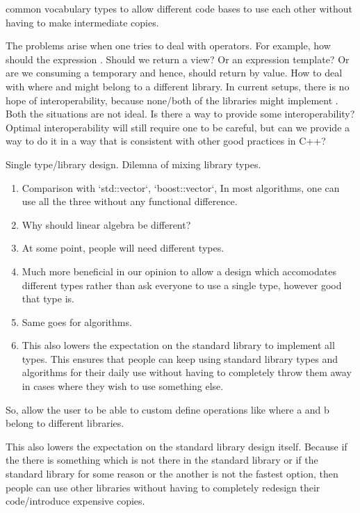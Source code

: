 \documentclass[oneside,11pt,a4paper]{jbarticle}
\begin{document}
common vocabulary types to allow different code bases to use each other without
having to make intermediate copies.


The problems arise when one tries to deal with operators. For example, how
should the expression . Should we return a view? Or an
expression template? Or are we consuming a temporary and hence, should return by
value. How to deal with  where  and 
might belong to a different library. In current setups, there is no hope of
interoperability, because none/both of the libraries might implement
. Both the situations are not ideal.
Is there a way to provide some interoperability? Optimal interoperability will
still require one to be careful, but can we provide a way to do it in a way that
is consistent with other good practices in C++?


Single type/library design. Dilemna of mixing library types.
\begin{enumerate}
  \item Comparison with `std::vector`, `boost::vector`,
    In most algorithms, one can use all the three without any functional
    difference.

  \item Why should linear algebra be different?

  \item At some point, people will need different types.

  \item Much more beneficial in our opinion to allow a design which accomodates
    different types rather than ask everyone to use a single type, however good
    that type is.

  \item Same goes for algorithms.

  \item This also lowers the expectation on the standard library to implement
    all types. This ensures that people can keep using standard library types
    and algorithms for their daily use without having to completely throw them
    away in cases where they wish to use something else.
\end{enumerate}

So, allow the user to be able to custom define operations like 
where a and b belong to different libraries.

This also lowers the expectation on the standard library design itself. Because
if the there is something which is not there in the standard library or if the
standard library for some reason or the another is not the fastest option, then
people can use other libraries without having to completely redesign their
code/introduce expensive copies.
\end{document}
